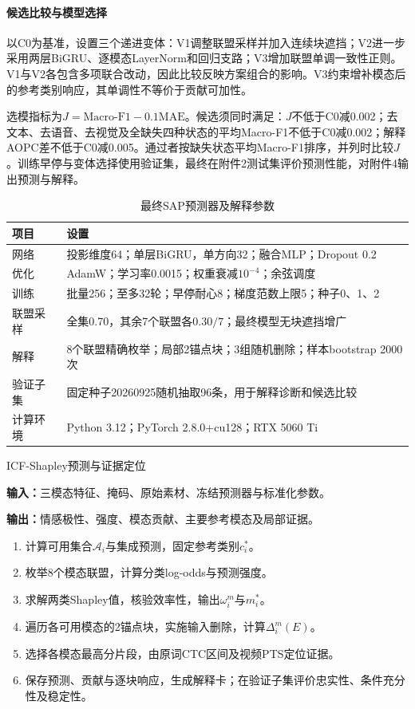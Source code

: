 \paragraph{候选比较与模型选择}
以C0为基准，设置三个递进变体：V1调整联盟采样并加入连续块遮挡；V2进一步采用两层BiGRU、逐模态LayerNorm和回归支路；V3增加联盟单调一致性正则。V1与V2各包含多项联合改动，因此比较反映方案组合的影响。V3约束增补模态后的参考类别响应，其单调性不等价于贡献可加性。

选模指标为$J=\mathrm{Macro\mbox{-}F1}-0.1\mathrm{MAE}$。候选须同时满足：$J$不低于C0减0.002；去文本、去语音、去视觉及全缺失四种状态的平均Macro-F1不低于C0减0.002；解释AOPC差不低于C0减0.005。通过者按缺失状态平均Macro-F1排序，并列时比较$J$。训练早停与变体选择使用验证集，最终在附件2测试集评价预测性能，对附件4输出预测与解释。

\begin{table}[htbp]\centering\small
\caption{最终SAP预测器及解释参数}\label{q3:tab:params}
\begin{tabularx}{\linewidth}{p{3.4cm}Y}\toprule
项目 & 设置\\\midrule
网络 & 投影维度64；单层BiGRU，单方向32；融合MLP；Dropout 0.2\\
优化 & AdamW；学习率0.0015；权重衰减$10^{-4}$；余弦调度\\
训练 & 批量256；至多32轮；早停耐心8；梯度范数上限5；种子0、1、2\\
联盟采样 & 全集0.70，其余7个联盟各$0.30/7$；最终模型无块遮挡增广\\
解释 & 8个联盟精确枚举；局部2锚点块；3组随机删除；样本bootstrap 2000次\\
验证子集 & 固定种子20260925随机抽取96条，用于解释诊断和候选比较\\
计算环境 & Python 3.12；PyTorch 2.8.0+cu128；RTX 5060 Ti\\\bottomrule
\end{tabularx}\end{table}

\begin{algorithm}[htbp]
\caption{ICF-Shapley预测与证据定位}\label{q3:alg}\small
\textbf{输入：}三模态特征、掩码、原始素材、冻结预测器与标准化参数。\par
\textbf{输出：}情感极性、强度、模态贡献、主要参考模态及局部证据。\par
\begin{enumerate}
\item 计算可用集合$\mathcal A_i$与集成预测，固定参考类别$c_i^*$。
\item 枚举8个模态联盟，计算分类log-odds与预测强度。
\item 求解两类Shapley值，核验效率性，输出$\omega_i^m$与$m_i^*$。
\item 遍历各可用模态的2锚点块，实施输入删除，计算$\Delta_i^m(E)$。
\item 选择各模态最高分片段，由原词CTC区间及视频PTS定位证据。
\item 保存预测、贡献与逐块响应，生成解释卡；在验证子集评价忠实性、条件充分性及稳定性。
\end{enumerate}
\end{algorithm}

